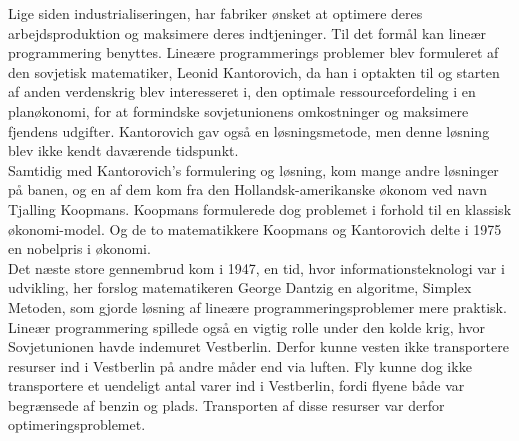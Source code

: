Lige siden industrialiseringen, har fabriker ønsket at optimere deres arbejdsproduktion og maksimere deres indtjeninger. 
Til det formål kan lineær programmering benyttes.
Lineære programmerings problemer blev formuleret af den sovjetisk matematiker, Leonid Kantorovich, da han i optakten til og starten af anden verdenskrig blev  interesseret i, den optimale ressourcefordeling i en planøkonomi, for at formindske sovjetunionens omkostninger og maksimere fjendens udgifter. Kantorovich gav også en løsningsmetode, men denne løsning blev ikke kendt daværende tidspunkt.\\
Samtidig med Kantorovich's formulering og løsning, kom  mange andre løsninger på banen, og en af dem kom fra den Hollandsk-amerikanske økonom ved navn Tjalling Koopmans. Koopmans formulerede dog problemet i forhold til en klassisk økonomi-model. 
Og de to matematikkere Koopmans og Kantorovich delte i 1975 en nobelpris i økonomi.\\
Det næste store gennembrud kom i 1947, en tid, hvor informationsteknologi var i udvikling, her forslog matematikeren George Dantzig  en algoritme, Simplex Metoden, som gjorde løsning af lineære programmeringsproblemer mere praktisk. 
\\%
Lineær programmering spillede også en vigtig rolle under den kolde krig, hvor Sovjetunionen havde indemuret Vestberlin.
Derfor kunne vesten ikke transportere resurser ind i Vestberlin på andre måder end via luften.
Fly kunne dog ikke transportere et uendeligt antal varer ind i Vestberlin, fordi flyene både var begrænsede af benzin og plads. 
Transporten af disse resurser var derfor optimeringsproblemet. \citep{bert} \citep{lay}